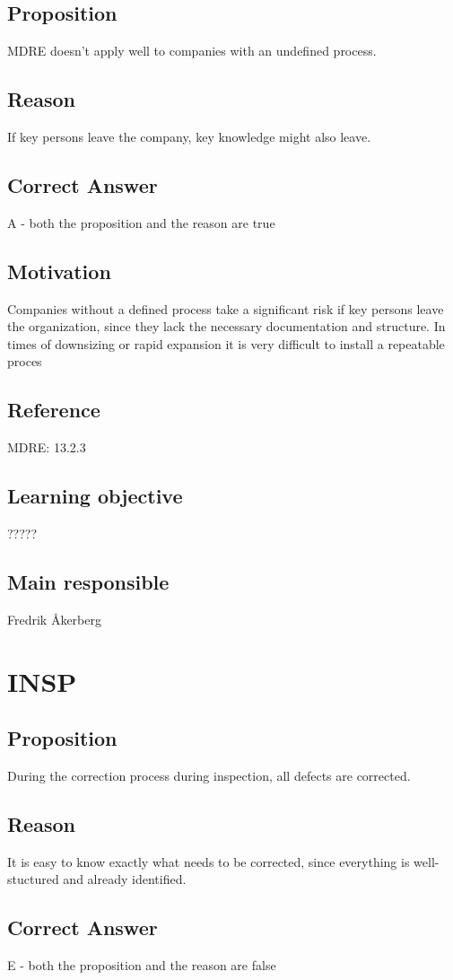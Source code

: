 \documentclass[a4paper]{article}
\begin{document}
\subsection*{Proposition}
MDRE doesn't apply well to companies with an undefined process.
\subsection*{Reason}
If key persons leave the company, key knowledge might also leave.
\subsection*{Correct Answer}
A - both the proposition and the reason are true
\subsection*{Motivation}
Companies without a defined process take a significant risk if key persons leave the organization, since they lack the necessary documentation and structure. In times of downsizing or rapid expansion it is very difficult to install a repeatable proces
\subsection*{Reference}
MDRE: 13.2.3
\subsection*{Learning objective}
?????
\subsection*{Main responsible}
 Fredrik Åkerberg


\section{INSP}
\subsection*{Proposition}
During the correction process during inspection, all defects are corrected.
\subsection*{Reason}
 It is easy to know exactly what needs to be corrected, since everything is well-stuctured and already identified.
\subsection*{Correct Answer}
E - both the proposition and the reason are false
\end{document}
